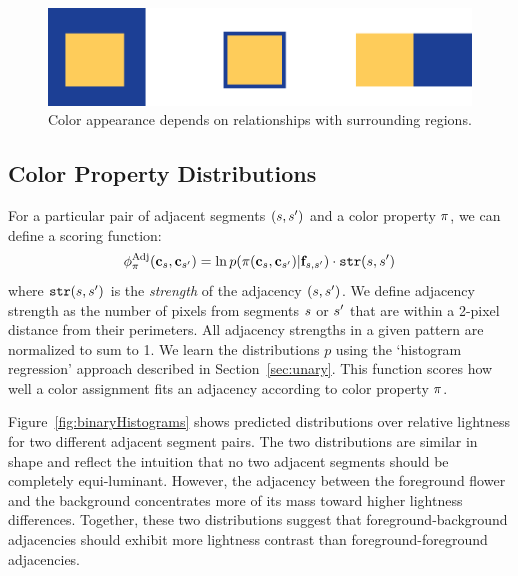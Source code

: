 \begin{figure}[h!]
\centering
\includegraphics[width=.7\columnwidth]{figs/surround}
\caption{Color appearance depends on relationships with surrounding regions.}
\label{fig:surround}
\end{figure}

\subsection{Color Property Distributions}
\label{sec:binaryDistribs}

For a particular pair of adjacent segments $(s, {s^{\prime}})$ and a color property $\pi$, we can define a scoring function: %
\begin{equation*}
\phi^{\textrm{Adj}}_\pi(\mathbf{c}_s, \mathbf{c}_{s^{\prime}}) = \ln p( \pi( \mathbf{c}_s, \mathbf{c}_{s^{\prime}} ) | \mathbf{f}_{s, {s^{\prime}}} ) \cdot \texttt{str}(s, {s^{\prime}})
\end{equation*}
where $\texttt{str}(s,{s^{\prime}})$ is the \emph{strength} of the adjacency $(s,{s^{\prime}})$. We define adjacency strength as the number of pixels from segments $s$ or ${s^{\prime}}$ that are within a 2-pixel distance from their perimeters. All adjacency strengths in a given pattern are normalized to sum to 1. We learn the distributions $p$ using the `histogram regression' approach described in Section~\ref{sec:unary}. This function scores how well a color assignment fits an adjacency according to color property $\pi$.

Figure~\ref{fig:binaryHistograms} shows predicted distributions over relative lightness for two different adjacent segment pairs. The two distributions are similar in shape and reflect the intuition that no two adjacent segments should be completely equi-luminant. However, the adjacency between the foreground flower and the background concentrates more of its mass toward higher lightness differences. Together, these two distributions suggest that foreground-background adjacencies should exhibit more lightness contrast than foreground-foreground adjacencies.

